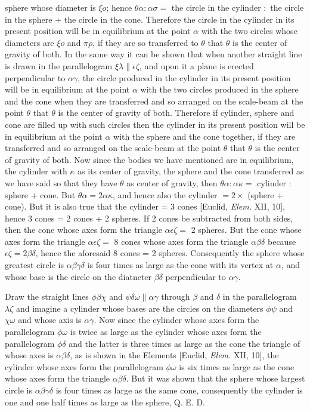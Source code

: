\documentclass[12pt]{article}
\begin{document}
sphere whose diameter is $\xi o$; hence $\theta\alpha : \alpha\sigma
=$ the circle in the cylinder $:$ the circle in the sphere $+$ the
circle in the cone. Therefore the circle in the cylinder in its
present position will be in equilibrium at the point $\alpha$ with the
two circles whose diameters are $\xi o$ and $\pi\rho$, if they are so
transferred to $\theta$ that $\theta$ is the center of gravity of
both. In the same way it can be shown that when another straight line
is drawn in the parallelogram $\xi\lambda \| \epsilon\zeta$, and upon
it a plane is erected perpendicular to $\alpha\gamma$, the circle
produced in the cylinder in its present position will be in
equilibrium at the point $\alpha$ with the two circles produced in the
sphere and the cone when they are transferred and so arranged on the
scale-beam at the point $\theta$ that $\theta$ is the center of
gravity of both. Therefore if cylinder, sphere and cone are filled up
with such circles then the cylinder in its present position will be in
equilibrium at the point $\alpha$ with the sphere and the cone
together, if they are transferred and so arranged on the scale-beam at
the point $\theta$ that $\theta$ is the center of gravity of both. Now
since the bodies we have mentioned are in equilibrium, the cylinder
with $\kappa$ as its center of gravity, the sphere and the cone
transferred as we have said so that they have $\theta$ as center of
gravity, then $\theta\alpha : \alpha\kappa =$ cylinder $:$ sphere $+$
cone. But $\theta\alpha = 2\alpha\kappa$, and hence also the cylinder
$= 2 \times$ (sphere $+$ cone). But it is also true that the cylinder
= 3 cones [Euclid, \emph{Elem.} XII, 10], hence 3 cones = 2 cones + 2
spheres. If 2 cones be subtracted from both sides, then the cone whose
axes form the triangle $\alpha\epsilon\zeta =$ 2 spheres. But the cone
whose axes form the triangle $\alpha\epsilon\zeta =$ 8 cones whose
axes form the triangle $\alpha\beta\delta$ because $\epsilon\zeta =
2\beta\delta$, hence the aforesaid 8 cones = 2 spheres. Consequently
the sphere whose greatest circle is $\alpha\beta\gamma\delta$ is four
times as large as the cone with its vertex at $\alpha$, and whose base
is the circle on the diatneter $\beta\delta$ perpendicular to
$\alpha\gamma$.

Draw the straight lines $\phi\beta\chi$ and $\psi\delta\omega \|
\alpha\gamma$ through $\beta$ and $\delta$ in the parallelogram
$\lambda\zeta$ and imagine a cylinder whose bases are the circles on
the diameters $\phi\psi$ and $\chi\omega$ and whose axis is
$\alpha\gamma$.  Now since the cylinder whose axes form the
parallelogram $\phi\omega$ is twice as large as the cylinder whose
axes form the parallelogram $\phi\delta$ and the latter is three times
as large as the cone the triangle of whose axes is
$\alpha\beta\delta$, as is shown in the Elements [Euclid, \emph{Elem.}
XII, 10], the cylinder whose axes form the parallelogram $\phi\omega$
is six times as large as the cone whose axes form the triangle
$\alpha\beta\delta$. But it was shown that the sphere whose largest
circle is $\alpha\beta\gamma\delta$ is four times as large as the same
cone, consequently the cylinder is one and one half times as large as
the sphere, Q. E. D.
\end{document}
